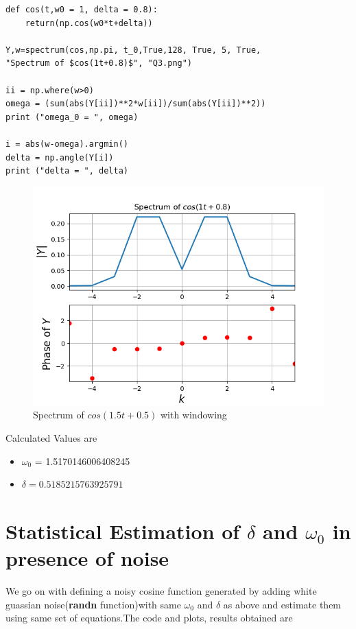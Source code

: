 \documentclass[12pt, a4paper]{report}
\begin{document}
    \begin{Verbatim}
def cos(t,w0 = 1, delta = 0.8):
    return(np.cos(w0*t+delta))

Y,w=spectrum(cos,np.pi, t_0,True,128, True, 5, True,
"Spectrum of $cos(1t+0.8)$", "Q3.png")

ii = np.where(w>0)
omega = (sum(abs(Y[ii])**2*w[ii])/sum(abs(Y[ii])**2))
print ("omega_0 = ", omega)

i = abs(w-omega).argmin()
delta = np.angle(Y[i])
print ("delta = ", delta)
\end{Verbatim}
 
   \begin{figure}[!tbh]
   	\centering
   	\includegraphics[scale=0.7]{Q3.png}
	\caption{Spectrum of $cos(1.5t+0.5)$ with windowing}
 \end{figure} 

Calculated Values are
\begin{itemize}

      \item $\omega_0$ =  1.5170146006408245
      \item $\delta =  0.5185215763925791$ 
\end{itemize}
   
   
  \section*{Statistical Estimation of $\delta$ and $\omega_0$ in presence of noise} 
  We go on with defining a noisy cosine function generated by adding white guassian noise(\textbf{randn} function)with same $\omega_0$ and $\delta$ as above and estimate them using same set of equations.The code and plots, results obtained are
  
\end{document}
